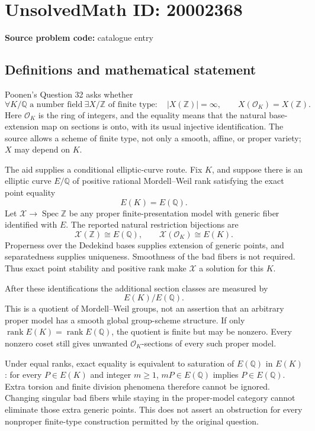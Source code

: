 \documentclass[11pt]{article}
\newcommand{\Z}{\mathbb{Z}}
\newcommand{\Q}{\mathbb{Q}}
\begin{document}
\section*{UnsolvedMath ID: 20002368}
\textbf{Source problem code:} catalogue entry
\subsection{Definitions and mathematical statement}
Poonen's Question 32 asks whether
\[
 \forall K/\Q\text{ a number field}\ \exists X/\Z\text{ of finite type}:\quad
 |X(\Z)|=\infty,\qquad X(\mathcal O_K)=X(\Z).
\]
Here \(\mathcal O_K\) is the ring of integers, and the equality means that the natural base-extension map on sections is onto, with its usual injective identification. The source allows a scheme of finite type, not only a smooth, affine, or proper variety; \(X\) may depend on \(K\).

The aid supplies a conditional elliptic-curve route. Fix \(K\), and suppose there is an elliptic curve \(E/\Q\) of positive rational Mordell--Weil rank satisfying the exact point equality
\[
 E(K)=E(\Q).
\]
Let \(\mathcal X\to\operatorname{Spec}\Z\) be any proper finite-presentation model with generic fiber identified with \(E\). The reported natural restriction bijections are
\[
 \mathcal X(\Z)\cong E(\Q),\qquad
 \mathcal X(\mathcal O_K)\cong E(K).
\]
Properness over the Dedekind bases supplies extension of generic points, and separatedness supplies uniqueness. Smoothness of the bad fibers is not required. Thus exact point stability and positive rank make \(\mathcal X\) a solution for this \(K\).

After these identifications the additional section classes are measured by
\[
 E(K)/E(\Q).
\]
This is a quotient of Mordell--Weil groups, not an assertion that an arbitrary proper model has a smooth global group-scheme structure. If only
\(\operatorname{rank}E(K)=\operatorname{rank}E(\Q)\), the quotient is finite but may be nonzero. Every nonzero coset still gives unwanted \(\mathcal O_K\)-sections of every such proper model.

Under equal ranks, exact equality is equivalent to saturation of \(E(\Q)\) in \(E(K)\): for every \(P\in E(K)\) and integer \(m\ge1\), \(mP\in E(\Q)\) implies \(P\in E(\Q)\). Extra torsion and finite division phenomena therefore cannot be ignored. Changing singular bad fibers while staying in the proper-model category cannot eliminate those extra generic points. This does not assert an obstruction for every nonproper finite-type construction permitted by the original question.
\end{document}

